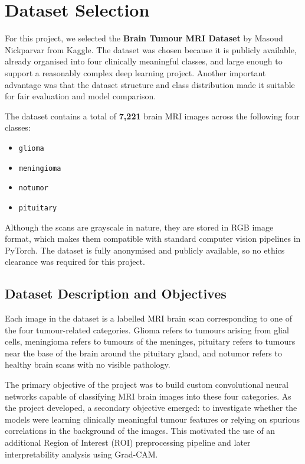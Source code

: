 \documentclass{article}
\begin{document}
\section{Dataset Selection}

For this project, we selected the \textbf{Brain Tumour MRI Dataset} by Masoud Nickparvar from Kaggle. The dataset was chosen because it is publicly available, already organised into four clinically meaningful classes, and large enough to support a reasonably complex deep learning project. Another important advantage was that the dataset structure and class distribution made it suitable for fair evaluation and model comparison.

The dataset contains a total of \textbf{7,221} brain MRI images across the following four classes:

\begin{itemize}
    \item \texttt{glioma}
    \item \texttt{meningioma}
    \item \texttt{notumor}
    \item \texttt{pituitary}
\end{itemize}

Although the scans are grayscale in nature, they are stored in RGB image format, which makes them compatible with standard computer vision pipelines in PyTorch. The dataset is fully anonymised and publicly available, so no ethics clearance was required for this project.

\subsection{Dataset Description and Objectives}

Each image in the dataset is a labelled MRI brain scan corresponding to one of the four tumour-related categories. Glioma refers to tumours arising from glial cells, meningioma refers to tumours of the meninges, pituitary refers to tumours near the base of the brain around the pituitary gland, and notumor refers to healthy brain scans with no visible pathology.

The primary objective of the project was to build custom convolutional neural networks capable of classifying MRI brain images into these four categories. As the project developed, a secondary objective emerged: to investigate whether the models were learning clinically meaningful tumour features or relying on spurious correlations in the background of the images. This motivated the use of an additional Region of Interest (ROI) preprocessing pipeline and later interpretability analysis using Grad-CAM.
\end{document}
